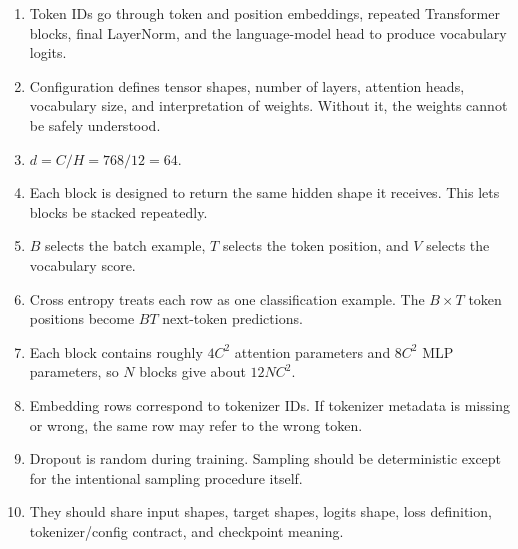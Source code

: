 \begin{enumerate}
  \item Token IDs go through token and position embeddings, repeated Transformer blocks, final LayerNorm, and the language-model head to produce vocabulary logits.
  \item Configuration defines tensor shapes, number of layers, attention heads, vocabulary size, and interpretation of weights. Without it, the weights cannot be safely understood.
  \item \(d=C/H=768/12=64\).
  \item Each block is designed to return the same hidden shape it receives. This lets blocks be stacked repeatedly.
  \item \(B\) selects the batch example, \(T\) selects the token position, and \(V\) selects the vocabulary score.
  \item Cross entropy treats each row as one classification example. The \(B\times T\) token positions become \(B T\) next-token predictions.
  \item Each block contains roughly \(4C^2\) attention parameters and \(8C^2\) MLP parameters, so \(N\) blocks give about \(12NC^2\).
  \item Embedding rows correspond to tokenizer IDs. If tokenizer metadata is missing or wrong, the same row may refer to the wrong token.
  \item Dropout is random during training. Sampling should be deterministic except for the intentional sampling procedure itself.
  \item They should share input shapes, target shapes, logits shape, loss definition, tokenizer/config contract, and checkpoint meaning.
\end{enumerate}
